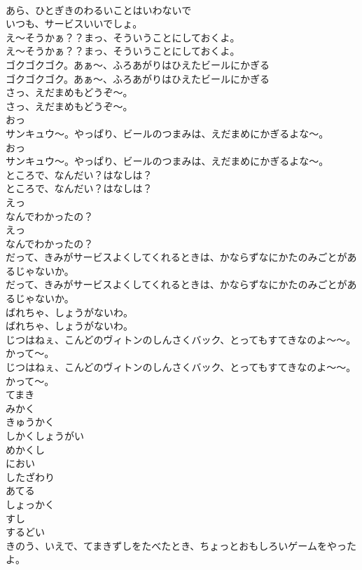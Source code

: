\documentclass[8pt]{extreport}
\begin{document}
\begin{CJK}{UTF8}{min}
\\	あら、ひとぎきのわるいことはいわないで
\\	いつも、サービスいいでしょ。
\\	え～そうかぁ？？まっ、そういうことにしておくよ。
\\	え～そうかぁ？？まっ、そういうことにしておくよ。
\\	ゴクゴクゴク。あぁ～、ふろあがりはひえたビールにかぎる
\\	ゴクゴクゴク。あぁ～、ふろあがりはひえたビールにかぎる
\\	さっ、えだまめもどうぞ～。
\\	さっ、えだまめもどうぞ～。
\\	おっ
\\	サンキュウ～。やっぱり、ビールのつまみは、えだまめにかぎるよな～。
\\	おっ
\\	サンキュウ～。やっぱり、ビールのつまみは、えだまめにかぎるよな～。
\\	ところで、なんだい？はなしは？
\\	ところで、なんだい？はなしは？
\\	えっ
\\	なんでわかったの？
\\	えっ
\\	なんでわかったの？
\\	だって、きみがサービスよくしてくれるときは、かならずなにかたのみごとがあるじゃないか。
\\	だって、きみがサービスよくしてくれるときは、かならずなにかたのみごとがあるじゃないか。
\\	ばれちゃ、しょうがないわ。
\\	ばれちゃ、しょうがないわ。
\\	じつはねぇ、こんどのヴィトンのしんさくバック、とってもすてきなのよ～～。かって～。
\\	じつはねぇ、こんどのヴィトンのしんさくバック、とってもすてきなのよ～～。かって～。
\\	てまき
\\	みかく
\\	きゅうかく
\\	しかくしょうがい
\\	めかくし
\\	におい
\\	したざわり
\\	あてる
\\	しょっかく
\\	すし
\\	するどい
\\	きのう、いえで、てまきずしをたべたとき、ちょっとおもしろいゲームをやったよ。

\end{CJK}
\end{document}
